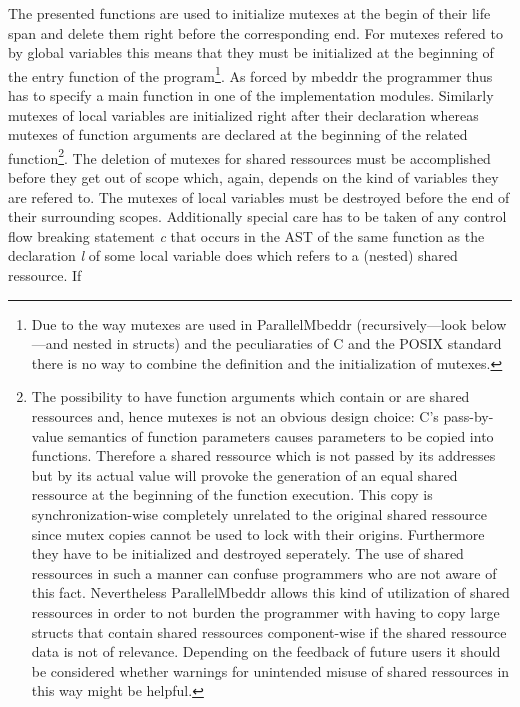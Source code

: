 The presented functions are used to initialize mutexes at the begin of their life span and delete them right before the corresponding end. For mutexes refered to by global variables this means that they must be initialized at the beginning of the entry function of the program\footnote{Due to the way mutexes are used in ParallelMbeddr (recursively---look below---and nested in structs) and the peculiaraties of C and the POSIX standard there is no way to combine the definition and the initialization of mutexes.}. As forced by mbeddr the programmer thus has to specify a main function in one of the implementation modules. Similarly mutexes of local variables are initialized right after their declaration whereas mutexes of function arguments are declared at the beginning of the related function\footnote{The possibility to have function arguments which contain or are shared ressources and, hence mutexes is not an obvious design choice: C's pass-by-value semantics of function parameters causes parameters to be copied into functions. Therefore a shared ressource which is not passed by its addresses but by its actual value will provoke the generation of an equal shared ressource at the beginning of the function execution. This copy is synchronization-wise completely unrelated to the original shared ressource since mutex copies cannot be used to lock with their origins. Furthermore they have to be initialized and destroyed seperately. The use of shared ressources in such a manner can confuse programmers who are not aware of this fact. Nevertheless ParallelMbeddr allows this kind of utilization of shared ressources in order to not burden the programmer with having to copy large structs that contain shared ressources component-wise if the shared ressource data is not of relevance. Depending on the feedback of future users it should be considered whether warnings for unintended misuse of shared ressources in this way might be helpful.}. The deletion of mutexes for shared ressources must be accomplished before they get out of scope which, again, depends on the kind of variables they are refered to. 
The mutexes of local variables must be destroyed before the end of their surrounding scopes. Additionally special care has to be taken of any control flow breaking statement \textit{c} that occurs in the AST of the same function as the declaration \textit{l} of some local variable does which refers to a (nested) shared ressource. If 
